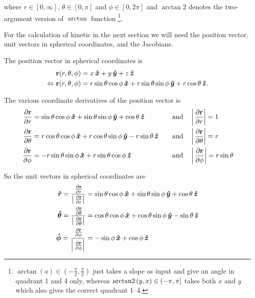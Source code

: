 where \(r \in [0, \infty]\), \(\theta \in [0, \pi]\) and \(\phi \in [0, 2\pi]\) and \(\arctan2\) denotes the two-argument version of \(\arctan\) function \footnote{\(\arctan{(a)} \in (-\frac{\pi}{2}, \frac{\pi}{2})\) just takes a slope as input and give an angle in quadrant 1 and 4 only, whereas \(\operatorname{arctan2}{(y,x)} \in (-\pi, \pi]\) takes both \(x\) and \(y\) which also gives the correct quadrant 1–4.}\cite{WikiAtan2}.

For the calculation of kinetic in the next section we will need the position vector, unit vectors in spherical coordinates, and the Jacobians.

The position vector in spherical coordinates is
\begin{align}
    \mathbf{r}(r, \theta, \phi) &= x \operatorname{}\!\bm{\hat{x}} + y \operatorname{}\!\bm{\hat{y}} + z \operatorname{}\!\bm{\hat{z}} \\
    \Leftrightarrow \mathbf{r}(r, \theta, \phi) &= r \sin{\theta}\cos{\phi} \operatorname{}\!\bm{\hat{x}} + r \sin{\theta}\sin{\phi} \operatorname{}\!\bm{\hat{y}} + r \cos{\theta} \operatorname{}\!\bm{\hat{z}}. \label{eq:position-vec-spherical}
\end{align}

The various coordinate derivatives of the position vector is
\begin{align}
    \pd{\vec{r}}{r} &= \sin{\theta}\cos{\phi} \xhat + \sin{\theta}\sin{\phi} \yhat + \cos{\theta} \zhat \quad &\text{and} \quad &\left| \pd{\vec{r}}{r} \right| = 1 \label{eq:position-derived-r} \\
    \pd{\vec{r}}{\theta} &= r \cos{\theta}\cos{\phi} \xhat + r \cos{\theta}\sin{\phi} \yhat - r \sin{\theta} \zhat \quad &\text{and} \quad &\left| \pd{\vec{r}}{\theta} \right| = r \label{eq:position-derived-theta} \\
    \pd{\vec{r}}{\phi} &= -r\sin{\theta}\sin{\phi} \xhat + r\sin{\theta}\cos{\phi} \zhat \quad &\text{and} \quad &\left| \pd{\vec{r}}{\phi} \right| = r\sin{\theta} \label{eq:position-derived-phi}
\end{align}

So the unit vectors in spherical coordinates are
\begin{align}
    \rhat = \dfrac{\pd{\vec{r}}{r}}{\left| \pd{\vec{r}}{r} \right| } &= \sin{\theta}\cos{\phi} \xhat + \sin{\theta}\sin{\phi} \yhat + \cos{\theta} \zhat \label{eq:r-hat}\\
    \thetahat = \dfrac{\pd{\vec{r}}{\theta}}{\left| \pd{\vec{r}}{\theta} \right| } &= \cos{\theta}\cos{\phi} \xhat + \cos{\theta}\sin{\phi} \yhat - \sin{\theta} \zhat \label{eq:theta-hat}\\
    \phihat = \dfrac{\pd{\vec{r}}{\phi}}{\left| \pd{\vec{r}}{\phi} \right| } &= -\sin{\phi} \xhat + \cos{\phi} \zhat \label{eq:phi-hat}
\end{align}

